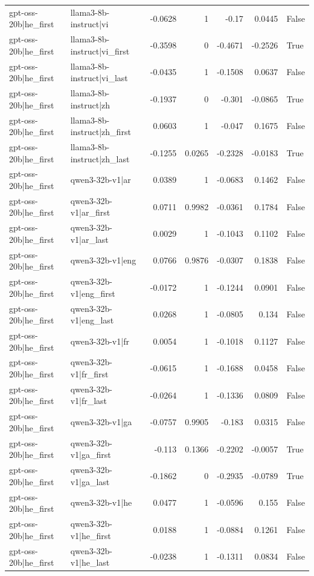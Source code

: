 \begin{table}
\begin{tabular}{l l r r r r l}
gpt-oss-20b|he_first & llama3-8b-instruct|vi & -0.0628 & 1 & -0.17 & 0.0445 & False \\
gpt-oss-20b|he_first & llama3-8b-instruct|vi_first & -0.3598 & 0 & -0.4671 & -0.2526 & True \\
gpt-oss-20b|he_first & llama3-8b-instruct|vi_last & -0.0435 & 1 & -0.1508 & 0.0637 & False \\
gpt-oss-20b|he_first & llama3-8b-instruct|zh & -0.1937 & 0 & -0.301 & -0.0865 & True \\
gpt-oss-20b|he_first & llama3-8b-instruct|zh_first & 0.0603 & 1 & -0.047 & 0.1675 & False \\
gpt-oss-20b|he_first & llama3-8b-instruct|zh_last & -0.1255 & 0.0265 & -0.2328 & -0.0183 & True \\
gpt-oss-20b|he_first & qwen3-32b-v1|ar & 0.0389 & 1 & -0.0683 & 0.1462 & False \\
gpt-oss-20b|he_first & qwen3-32b-v1|ar_first & 0.0711 & 0.9982 & -0.0361 & 0.1784 & False \\
gpt-oss-20b|he_first & qwen3-32b-v1|ar_last & 0.0029 & 1 & -0.1043 & 0.1102 & False \\
gpt-oss-20b|he_first & qwen3-32b-v1|eng & 0.0766 & 0.9876 & -0.0307 & 0.1838 & False \\
gpt-oss-20b|he_first & qwen3-32b-v1|eng_first & -0.0172 & 1 & -0.1244 & 0.0901 & False \\
gpt-oss-20b|he_first & qwen3-32b-v1|eng_last & 0.0268 & 1 & -0.0805 & 0.134 & False \\
gpt-oss-20b|he_first & qwen3-32b-v1|fr & 0.0054 & 1 & -0.1018 & 0.1127 & False \\
gpt-oss-20b|he_first & qwen3-32b-v1|fr_first & -0.0615 & 1 & -0.1688 & 0.0458 & False \\
gpt-oss-20b|he_first & qwen3-32b-v1|fr_last & -0.0264 & 1 & -0.1336 & 0.0809 & False \\
gpt-oss-20b|he_first & qwen3-32b-v1|ga & -0.0757 & 0.9905 & -0.183 & 0.0315 & False \\
gpt-oss-20b|he_first & qwen3-32b-v1|ga_first & -0.113 & 0.1366 & -0.2202 & -0.0057 & True \\
gpt-oss-20b|he_first & qwen3-32b-v1|ga_last & -0.1862 & 0 & -0.2935 & -0.0789 & True \\
gpt-oss-20b|he_first & qwen3-32b-v1|he & 0.0477 & 1 & -0.0596 & 0.155 & False \\
gpt-oss-20b|he_first & qwen3-32b-v1|he_first & 0.0188 & 1 & -0.0884 & 0.1261 & False \\
gpt-oss-20b|he_first & qwen3-32b-v1|he_last & -0.0238 & 1 & -0.1311 & 0.0834 & False \\

\end{tabular}
\end{table}
